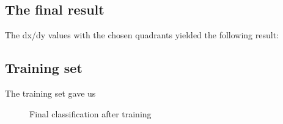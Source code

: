 \documentclass{article}
\begin{document}
	\subsection{The final result}
	The dx/dy values with the chosen quadrants yielded the following result: 

\newpage
\subsection{Training set}
	The training set gave us
	\begin{figure}[h!]%
		\centering
    	\caption{Final classification after training}%
    	\label{fig:f0}%
	\end{figure}
	
\end{document}

